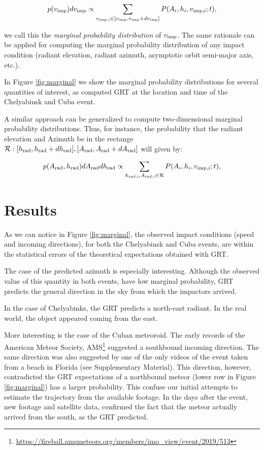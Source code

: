 \documentclass[fleqn,usenatbib]{mnras}
\newcommand{\sub}[1]{_{\rm #1}}
\newcommand{\vimp}{v\sub{imp}}
\begin{document}
$$
p(\vimp)d\vimp\propto \sum_{v_{\rm imp,i}\in [\vimp,\vimp+d\vimp]} P(A_i,h_i,v\sub{imp,i};t),
$$

we call this the \textit{marginal probability distribution} of $\vimp$. The same rationale can be applied for computing the marginal probability distribution of any impact condition (radiant elevation, radiant azimuth, asymptotic orbit semi-major axis, etc.). 

In Figure \ref{fig:marginal} we show the marginal probability distributions for several quantities of interest, as computed GRT at the location and time of the Chelyabinsk and Cuba event.  

A similar approach can be generalized to compute two-dimensional marginal probability distributions.  Thus, for instance, the probability that the radiant elevation and Azimuth be in the rectange ${\cal R}:[h_{\rm rad},h_{\rm rad}+dh_{\rm rad}], [A_{\rm rad},A_{\rm rad}+dA_{\rm rad}]$ will given by:

$$
p(A_{\rm rad},h_{\rm rad})dA_{\rm rad}dh_{\rm rad}\propto \sum_{h_{\rm rad,i},A_{\rm rad,i}\in {\cal R}} P(A_i,h_i,v\sub{imp,i};t),
$$

\section{Results}
\label{sec:tratm}

As we can notice in Figure \ref{fig:marginal}, the observed impact conditions (speed and incoming directions), for both the Chelyabinsk and Cuba events, are within the statistical errors of the theoretical expectations obtained with GRT. 

The case of the predicted azimuth is especially interesting.  Although the observed value of this quantity in both events, have low marginal probability, GRT predicts the general direction in the sky from which the impactors arrived.  

In the case of Chelyabinks, the GRT predicts a north-east radiant.  In the real world, the object appeared coming from the east.

More interesting is the case of the Cuban meteoroid.  The early records of the American Meteor Society, AMS\footnote{\url{https://fireball.amsmeteors.org/members/imo_view/event/2019/513}} suggested a southbound incoming direction.  The same direction was also suggested by one of the only videos of the event taken from a beach in Florida (see Supplementary Material).  This direction, however, contradicted the GRT expectations of a northbound meteor (lower row in Figure \ref{fig:marginal}) has a larger probability.  This confuse our initial attempts to estimate the trajectory from the available footage.  In the days after the event, new footage and satellite data, confirmed the fact that the meteor actually arrived from the south, as the GRT predicted.
\end{document}
